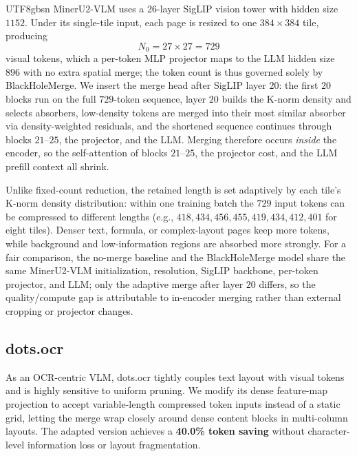 \documentclass[10pt,twocolumn,letterpaper]{article}
\newcommand{\ours}{BlackHoleMerge}
\begin{document}
\begin{CJK}{UTF8}{gbsn}
MinerU2-VLM uses a 26-layer SigLIP vision tower with hidden size $1152$. Under its single-tile
input, each page is resized to one $384\times384$ tile, producing
\begin{equation}
    N_0 = 27 \times 27 = 729
\end{equation}
visual tokens, which a per-token MLP projector maps to the LLM hidden size $896$ with no extra
spatial merge; the token count is thus governed solely by \ours{}. We insert the merge head after
SigLIP layer $20$: the first $20$ blocks run on the full $729$-token sequence, layer $20$ builds
the K-norm density and selects absorbers, low-density tokens are merged into their most similar
absorber via density-weighted residuals, and the shortened sequence continues through blocks
$21$--$25$, the projector, and the LLM. Merging therefore occurs \emph{inside} the encoder, so the
self-attention of blocks $21$--$25$, the projector cost, and the LLM prefill context all shrink.

Unlike fixed-count reduction, the retained length is set adaptively by each tile's K-norm density
distribution: within one training batch the $729$ input tokens can be compressed to different
lengths (e.g., $418, 434, 456, 455, 419, 434, 412, 401$ for eight tiles). Denser text, formula, or
complex-layout pages keep more tokens, while background and low-information regions are absorbed
more strongly. For a fair comparison, the no-merge baseline and the \ours{} model share the same
MinerU2-VLM initialization, resolution, SigLIP backbone, per-token projector, and LLM; only the
adaptive merge after layer $20$ differs, so the quality/compute gap is attributable to in-encoder
merging rather than external cropping or projector changes.

\subsection{dots.ocr}
As an OCR-centric VLM, dots.ocr tightly couples text layout with visual tokens and is highly
sensitive to uniform pruning. We modify its dense feature-map projection to accept
variable-length compressed token inputs instead of a static grid, letting the merge wrap closely
around dense content blocks in multi-column layouts. The adapted version achieves a
\textbf{40.0\% token saving} without character-level information loss or layout fragmentation.


\end{CJK}
\end{document}
